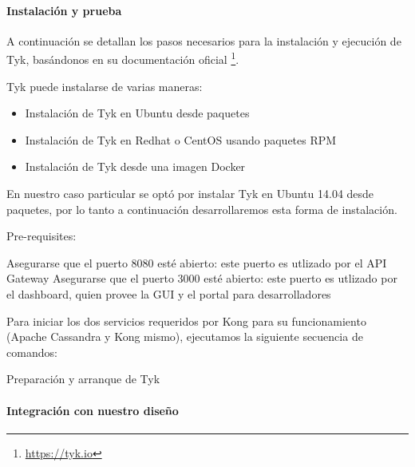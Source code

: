 \paragraph{Instalación y prueba}

A continuación se detallan los pasos necesarios para la instalación y ejecución de Tyk, basándonos en su documentación oficial \footnote{\url{https://tyk.io}}.

Tyk puede instalarse de varias maneras:

\begin{itemize}
  \item Instalación de Tyk en Ubuntu desde paquetes
  \item Instalación de Tyk en Redhat o CentOS usando paquetes RPM
  \item Instalación de Tyk desde una imagen Docker
\end{itemize}

En nuestro caso particular se optó por instalar Tyk en Ubuntu 14.04 desde paquetes, por lo tanto a continuación desarrollaremos esta forma de instalación.

Pre-requisites:

Asegurarse que el puerto 8080 esté abierto: este puerto es utlizado por el API Gateway
Asegurarse que el puerto 3000 esté abierto: este puerto es utlizado por el dashboard, quien provee la GUI y el portal para desarrolladores

Para iniciar los dos servicios requeridos por Kong para su funcionamiento (Apache Cassandra y Kong mismo), ejecutamos la siguiente secuencia de comandos:

\begin{listing}[H]
  \caption{Preparación y arranque de Tyk}
  \label{soa:tecnologias:tyk:bash-preparacion}
\end{listing}


\paragraph{Integración con nuestro diseño}

